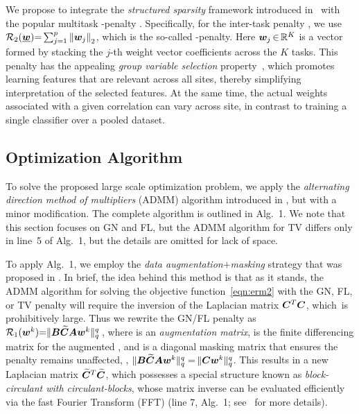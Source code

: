 We propose to integrate the \emph{structured sparsity} framework introduced in~\cite{Watanabe:2014} with the popular multitask \mbox{\MTL-penalty} \cite{Obozinski:2010,Chen:2012b}.
Specifically, for the inter-task penalty \RegB, we use $\mathcal{R}_2(\underline{{\bm{w}}}){=}\sum_{j=1}^p \left\| {\bm{w}}_j \right\|_2$, which is the so-called \MTL-penalty.
Here ${\bm{w}}_j\,{\in}\,\mathbb{R}^K$ is a vector formed by stacking the \mbox{$j$-th} weight vector coefficients across the $K$  tasks.
This penalty has the appealing \emph{group variable selection} property~\cite{Obozinski:2010,Chen:2012b}, which promotes learning features that are relevant across all sites, thereby simplifying interpretation of the selected features. At the same time, the actual weights associated with a given correlation can vary across site, in contrast to training a single classifier over a pooled dataset.

\afterpage{}

\vspace{-4pt}\subsection{Optimization Algorithm}\vspace{-2pt}
To solve the proposed large scale optimization problem, we apply the \emph{alternating direction method of multipliers} (ADMM) algorithm \cite{Boyd:2011} introduced in \cite{Watanabe:2014}, but with a minor modification.
The complete algorithm is outlined in Alg.~1.
We note that this section focuses on GN and FL, but the ADMM algorithm for TV differs only in line~5 of Alg.~1, but the details are omitted for lack of space.

To apply Alg.~1, we employ the \emph{data augmentation}${+}$\emph{masking} strategy that was proposed in \cite{Watanabe:2014}.
In brief, the idea behind this method is that as it stands, the ADMM algorithm for solving the objective function~\eqref{eqn:erm2} with the GN, FL, or TV penalty will require the inversion of the Laplacian matrix ${\bm{C}}^T{\bm{C}}$, which~is prohibitively large.
Thus we rewrite the GN/FL penalty as $\mathcal{R}_1({\bm{w}}^k){=}\|{\bm{B}}{\bm{\widetilde{C}}}{\bm{A}}{\bm{w}}^k\|^q_q\,$, where \A is an \emph{augmentation \mbox{matrix}}, \Ctil is the finite differencing matrix for the augmented \wk, 
and \B is a diagonal masking matrix that ensures the penalty remains unaffected, \ie, $\|{\bm{B}}{\bm{\widetilde{C}}}{\bm{A}}{\bm{w}}^k\|^q_q\;{=}\,\|{\bm{C}}{\bm{w}}^k\|^q_q$.
This results in a new Laplacian matrix ${\bm{\widetilde{C}}}^T{\bm{\widetilde{C}}}$, which possesses a special structure known as \emph{block-circulant with circulant-blocks}, whose matrix inverse can be evaluated efficiently via the fast Fourier Transform (FFT) (line 7, Alg.~1; see~\cite{Watanabe:2014} for more details). 

